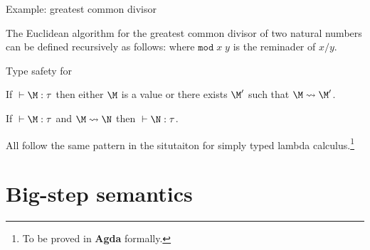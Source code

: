 \begin{frame}{Example: greatest common divisor}
\begin{example}
  The Euclidean algorithm for the greatest common divisor of two natural
  numbers can be defined recursively as follows:
  where $\mathtt{mod}\;x\;y$ is the reminader of $x / y$. 
\end{example}
\end{frame}

\begin{frame}{Type safety for \PCF}
  \begin{theorem}
    If ${} \vdash \M : \tau$ then either $\M$ is a value or
    there exists $\M'$ such that $\M \leadsto \M'$. 
  \end{theorem}
  \begin{theorem}
    If ${}\vdash \M : \tau$ and $\M \leadsto \N$ then ${}\vdash \N : \tau$. 
  \end{theorem}
  All follow the same pattern in the situtaiton for simply typed lambda
  calculus.\footnote{
    To be proved in \textbf{Agda} formally.
  }
\end{frame}

\section{Big-step semantics}

